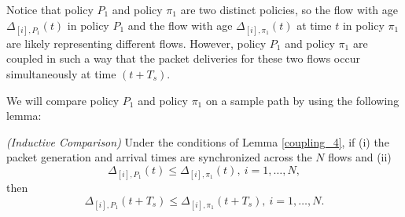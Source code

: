 Notice that policy $P_1$ and policy $\pi_1$ are two distinct policies, so the flow with age $\Delta_{[i],P_1}(t)$ in policy $P_1$ and the flow with age $\Delta_{[i],\pi_1}(t)$ at time $t$ in policy $\pi_1$ are likely representing different flows. However, policy $P_1$ and policy $\pi_1$ are coupled in such a way  that  the packet deliveries for these two flows occur simultaneously at time $(t+ T_s)$.

We will compare policy $P_1$ and policy $\pi_1$ on a sample path by using the following lemma: 

\begin{lemma} \emph{(Inductive Comparison)}\label{thm4lem2}
Under the conditions of Lemma \ref{coupling_4}, if  (i) the packet generation and arrival times are {synchronized} across the $N$ flows and (ii) 
\begin{equation}\label{thm4lem2eq1}
\Delta_{[i],P_1}(t) \leq \Delta_{[i],\pi_1}(t),~i=1,\ldots,N,
\end{equation}
then
\begin{equation}\label{thm4lem2eq2}
\Delta_{[i],P_1}(t+T_s)\leq \Delta_{[i],\pi_1}(t+T_s),~i=1,\ldots,N.
\end{equation}  
\end{lemma}

